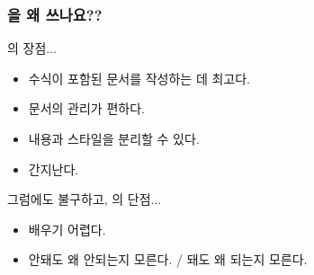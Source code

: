 \begin{frame}
    \frametitle{\tex{}을 왜 쓰나요??}

    \tex{}의 장점...
    \begin{itemize}
        \item 수식이 포함된 문서를 작성하는 데 최고다.
        \item 문서의 관리가 편하다.
        \item 내용과 스타일을 분리할 수 있다.
        \item 간지난다.
    \end{itemize}

    그럼에도 불구하고, \tex{}의 단점...
    \begin{itemize}
        \item 배우기 어렵다.
        \item 안돼도 왜 안되는지 모른다. / 돼도 왜 되는지 모른다.
    \end{itemize}
\end{frame}

